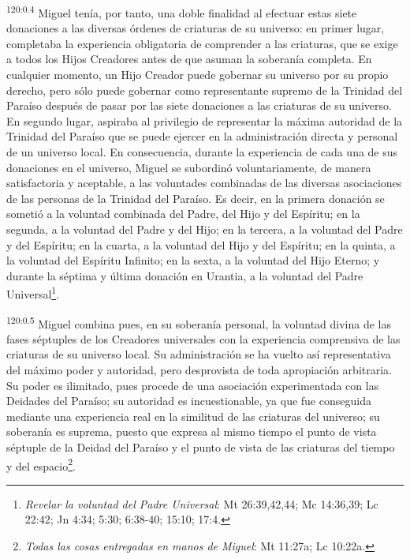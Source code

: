 \par
\textsuperscript{120:0.4} Miguel tenía, por tanto, una doble finalidad al efectuar estas siete donaciones a las diversas órdenes de criaturas de su universo: en primer lugar, completaba la experiencia obligatoria de comprender a las criaturas, que se exige a todos los Hijos Creadores antes de que asuman la soberanía completa. En cualquier momento, un Hijo Creador puede gobernar su universo por su propio derecho, pero sólo puede gobernar como representante supremo de la Trinidad del Paraíso después de pasar por las siete donaciones a las criaturas de su universo. En segundo lugar, aspiraba al privilegio de representar la máxima autoridad de la Trinidad del Paraíso que se puede ejercer en la administración directa y personal de un universo local. En consecuencia, durante la experiencia de cada una de sus donaciones en el universo, Miguel se subordinó voluntariamente, de manera satisfactoria y aceptable, a las voluntades combinadas de las diversas asociaciones de las personas de la Trinidad del Paraíso. Es decir, en la primera donación se sometió a la voluntad combinada del Padre, del Hijo y del Espíritu; en la segunda, a la voluntad del Padre y del Hijo; en la tercera, a la voluntad del Padre y del Espíritu; en la cuarta, a la voluntad del Hijo y del Espíritu; en la quinta, a la voluntad del Espíritu Infinito; en la sexta, a la voluntad del Hijo Eterno; y durante la séptima y última donación en Urantia, a la voluntad del Padre Universal\footnote{\textit{Revelar la voluntad del Padre Universal}: Mt 26:39,42,44; Mc 14:36,39; Lc 22:42; Jn 4:34; 5:30; 6:38-40; 15:10; 17:4.}.

\par
\textsuperscript{120:0.5} Miguel combina pues, en su soberanía personal, la voluntad divina de las fases séptuples de los Creadores universales con la experiencia comprensiva de las criaturas de su universo local. Su administración se ha vuelto así representativa del máximo poder y autoridad, pero desprovista de toda apropiación arbitraria. Su poder es ilimitado, pues procede de una asociación experimentada con las Deidades del Paraíso; su autoridad es incuestionable, ya que fue conseguida mediante una experiencia real en la similitud de las criaturas del universo; su soberanía es suprema, puesto que expresa al mismo tiempo el punto de vista séptuple de la Deidad del Paraíso y el punto de vista de las criaturas del tiempo y del espacio\footnote{\textit{Todas las cosas entregadas en manos de Miguel}: Mt 11:27a; Lc 10:22a.}.

